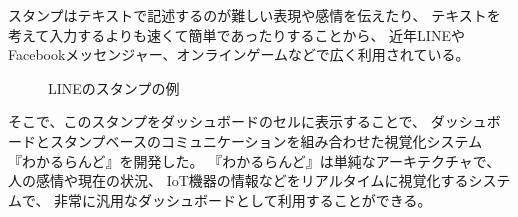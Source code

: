 スタンプはテキストで記述するのが難しい表現や感情を伝えたり、
テキストを考えて入力するよりも速くて簡単であったりすることから、
近年LINEやFacebookメッセンジャー、オンラインゲームなどで広く利用されている。

\begin{figure}[H]
\centering{}
\caption{LINEのスタンプの例}
\label{linestamp}
\end{figure}

\vspace{3mm}
そこで、このスタンプをダッシュボードのセルに表示することで、
ダッシュボードとスタンプベースのコミュニケーションを組み合わせた視覚化システム
『わかるらんど』を開発した。
『わかるらんど』は単純なアーキテクチャで、人の感情や現在の状況、
IoT機器の情報などをリアルタイムに視覚化するシステムで、
非常に汎用なダッシュボードとして利用することができる。




